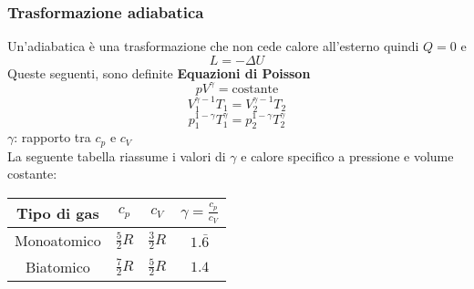 \subsubsection{Trasformazione adiabatica}
Un'adiabatica è una trasformazione che non cede calore all'esterno quindi $Q=0$ e
\begin{equation*}
  L = -\Delta U
\end{equation*}
Queste seguenti, sono definite \textbf{Equazioni di Poisson}
\begin{equation*}
  pV^\gamma = \text{costante}
\end{equation*}
\begin{equation*}
  V_1^{\gamma-1}T_1 = V_2^{\gamma-1}T_2
\end{equation*}
\begin{equation*}
  p_1^{1-\gamma}T_1^\gamma = p_2^{1-\gamma}T_2^\gamma
\end{equation*}
$\gamma$: rapporto tra $c_p$ e $c_V$\\ [\baselineskip] 
La seguente tabella riassume i valori di $\gamma$ e calore specifico a pressione e volume costante:
\begin{center}
  \begin{tabular}{c | c | c | c}
    Tipo di gas & $c_p$ & $c_V$ & $\gamma=\frac{c_p}{c_V}$\\ \hline
    Monoatomico & $\frac{5}{2}R$ & $\frac{3}{2}R$ & $1.\bar{6}$\\ \hline
    Biatomico & $\frac{7}{2}R$ & $\frac{5}{2}R$ & $1.4$\\
  \end{tabular}
\end{center}


